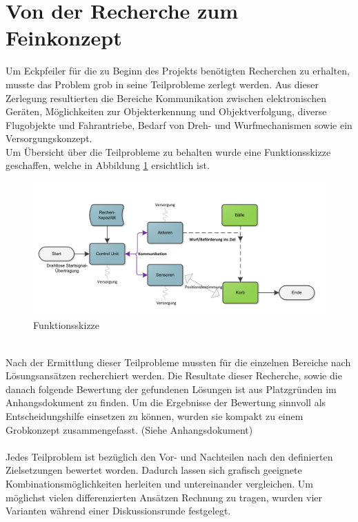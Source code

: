 \section{Von der Recherche zum Feinkonzept}
Um Eckpfeiler für die zu Beginn des Projekts benötigten Recherchen zu erhalten, musste das
Problem grob in seine Teilprobleme zerlegt werden. Aus dieser Zerlegung resultierten die
Bereiche Kommunikation zwischen elektronischen Geräten, Möglichkeiten zur Objekterkennung und
Objektverfolgung, diverse Flugobjekte und Fahrantriebe, Bedarf von Dreh- und Wurfmechanismen
sowie ein Versorgungskonzept. \\
Um Übersicht über die Teilprobleme zu behalten wurde eine Funktionsskizze geschaffen, welche
in  Abbildung \ref{fig:Funktionsskizze} ersichtlich ist.\\
\begin{figure}[h!]
	\centering
	\includegraphics[width=1\textwidth]{Enddokumentation/Varianten/Bilder/Funktionsskizze.png}
	\caption{Funktionsskizze}
	\label{fig:Funktionsskizze}
\end{figure}
\\
Nach der Ermittlung dieser Teilprobleme mussten für die einzelnen Bereiche nach Lösungsansätzen
recherchiert werden. Die Resultate dieser Recherche, sowie die danach folgende Bewertung der
gefundenen Lösungen ist aus Platzgründen im Anhangsdokument zu finden. Um die Ergebnisse der Bewertung
sinnvoll als Entscheidungshilfe einsetzen zu können, wurden sie kompakt zu einem Grobkonzept
zusammengefasst. (Siehe Anhangsdokument)\\
\\
Jedes Teilproblem ist bezüglich den Vor- und Nachteilen nach den definierten Zielsetzungen
bewertet worden. Dadurch lassen sich grafisch geeignete Kombinationsmöglichkeiten herleiten und
untereinander vergleichen. Um möglichst vielen differenzierten Ansätzen Rechnung zu tragen,
wurden vier Varianten während einer Diskussionsrunde festgelegt.
